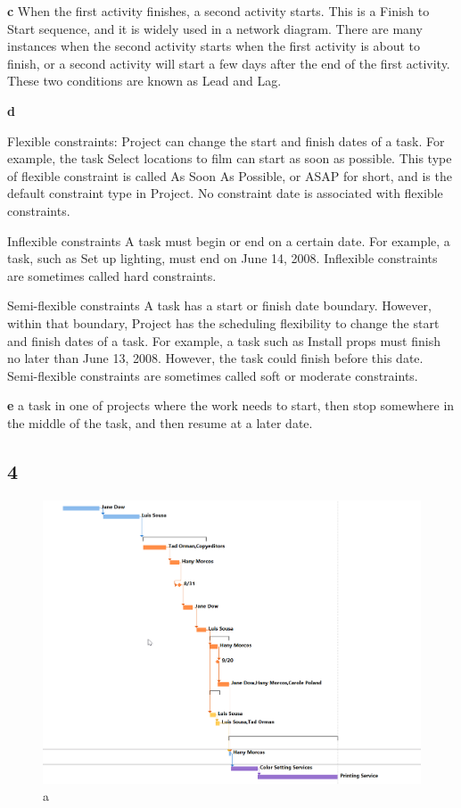 \documentclass[runningheads]{llncs}
\begin{document}
\noindent\textbf{c}
When the first activity finishes, a second activity starts. This is a Finish to Start sequence, and it is widely used in a network diagram. There are many instances when the second activity starts when the first activity is about to finish, or a second activity will start a few days after the end of the first activity. These two conditions are known as Lead and Lag.  

\noindent\textbf{d}

\noindent Flexible constraints: Project can change the start and finish dates of a task. For example, the task Select locations to film can start as soon as possible. This type of flexible constraint is called As Soon As Possible, or ASAP for short, and is the default constraint type in Project. No constraint date is associated with flexible constraints.

\noindent Inflexible constraints A task must begin or end on a certain date. For example, a task, such as Set up lighting, must end on June 14, 2008. Inflexible constraints are sometimes called hard constraints.

\noindent Semi-flexible constraints A task has a start or finish date boundary. However, within that boundary, Project has the scheduling flexibility to change the start and finish dates of a task. For example, a task such as Install props must finish no later than June 13, 2008. However, the task could finish before this date. Semi-flexible constraints are sometimes called soft or moderate constraints.

\noindent\textbf{e}
a task in one of projects where the work needs to start, then stop somewhere in the middle of the task, and then resume at a later date.

\subsection*{4}
\begin{figure}[h]
    \centering
    \includegraphics[width=1.0\textwidth]{image/f0}
    \caption{a}
\end{figure}
\end{document}
